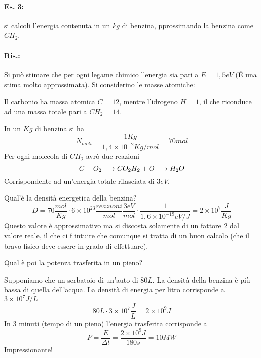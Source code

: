 \newpage
\paragraph{Es. 3:}
si calcoli l'energia contenuta in un $kg$ di benzina, pprossimando la benzina come $CH_2$.
\paragraph{Ris.:}
Si può stimare che per ogni legame chimico l'energia sia pari a $E=1,5eV$ (\'E una stima molto approssimata).
Si considerino le masse atomiche:

Il carbonio ha massa atomica $C=12$, mentre l'idrogeno $H=1$, il che riconduce ad una massa totale pari a $CH_2=14$.

In un $Kg$ di benzina si ha
\begin{equation}
N_{moli} =\frac{1Kg}{1,4\times 10^{-2}Kg/mol}=70mol
\end{equation}
Per ogni molecola di $CH_2$ avrò due reazioni
\begin{equation}
C+O_2\longrightarrow CO_2\\
H_2+O\longrightarrow H_2O
\end{equation}
Corrispondente ad un'energia totale rilasciata di $3eV$.

Qual'è la densità energetica della benzina?
\begin{equation}
D=70\frac{mol}{Kg}\cdot 6\times 10^{23}\frac{reazioni}{mol}\frac{3eV}{mol}\cdot \frac{1}{1,6\times 10^{-19}eV/J}=2\times 10^7\frac{J}{Kg}
\end{equation}
Questo valore è approssimativo ma si discosta solamente di un fattore 2 dal valore reale, il che ci f intuire che comunque si tratta di un buon calcolo (che il bravo fisico deve essere in grado di effettuare).

Qual è poi la potenza trasferita in un pieno?

Supponiamo che un serbatoio di un'auto di $80L$. La densità della benzina è più bassa di quella dell'acqua. 
La densità di energia per litro corrisponde a $3\times10^7J/L$
\begin{equation}
80L\cdot 3\times10^7\frac{J}{L}=2\times10^9J
\end{equation}
In 3 minuti (tempo di un pieno) l'energia trasferita corrisponde a 
\begin{equation}
P=\frac{E}{\Delta t}=\frac{2\times10^9J}{180s}=10MW
\end{equation}
Impressionante!

